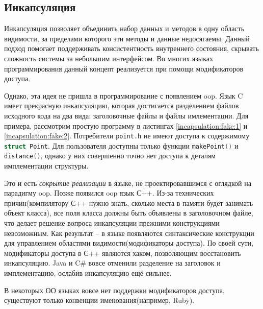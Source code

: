 \subsection{Инкапсуляция}
\label{sec:incapsulation}

Инкапсуляция позволяет объединить набор данных и методов в одну область видимости, за пределами которого эти методы и данные недосягаемы. Данный подход помогает поддерживать консистентность внутреннего состояния, скрывать сложность системы за небольшим интерфейсом. Во многих языках программирования данный концепт реализуется при помощи модификаторов доступа.

Однако, эта идея не пришла в программирование с появлением \gls{oop}. Язык C имеет прекрасную инкапсуляцию, которая достигается разделением файлов исходного кода на два вида: заголовочные файлы и файлы имлементации. Для примера, рассмотрим простую программу в листингах \ref{incapsulation:fake:1} и \ref{incapsulation:fake:2}. Потребители \texttt{point.h} не имеют доступа к содержимому \lstinline[language=C]{struct Point}. Для пользователя доступны только функции \lstinline[language=C]{makePoint()} и \lstinline[language=C]{distance()}, однако у них совершенно точно нет доступа к деталям имплементации структуры.

 Это и есть \textit{сокрытие реализации} в языке, не проектировавшимся с оглядкой на парадигму \gls{oop}. Позже появился \gls{oop} язык С++. Из-за технических причин(компилятору С++ нужно знать, сколько места в памяти будет занимать объект класса), все поля класса должны быть объявлены в заголовочном файле, что делает решение вопроса инкапсуляции прежними конструкциями невозможным. Как результат -- в языке появляются синтаксические конструкции для управлением областями видимости(модификаторы доступа). По своей сути, модификаторы доступа в С++ являются хаком, позволяющим восстановить инкапсуляцию. Java и C\# вовсе отменили разделение на заголовок и имплементацию, ослабив инкапсуляцию ещё сильнее. 

В некоторых ОО языках вовсе нет поддержки модификаторов доступа, существуют только конвенции именования(например, Ruby).